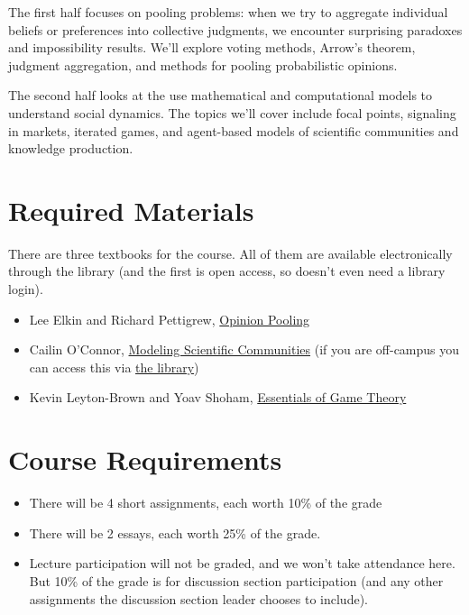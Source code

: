 \documentclass[
  letterpaper,
  DIV=11,
  numbers=noendperiod]{scrartcl}
\providecommand{\tightlist}{%
  \setlength{\itemsep}{0pt}\setlength{\parskip}{0pt}}
\begin{document}
The first half focuses on pooling problems: when we try to aggregate
individual beliefs or preferences into collective judgments, we
encounter surprising paradoxes and impossibility results. We'll explore
voting methods, Arrow's theorem, judgment aggregation, and methods for
pooling probabilistic opinions.

The second half looks at the use mathematical and computational models
to understand social dynamics. The topics we'll cover include focal
points, signaling in markets, iterated games, and agent-based models of
scientific communities and knowledge production.

\section{Required Materials}\label{required-materials}

There are three textbooks for the course. All of them are available
electronically through the library (and the first is open access, so
doesn't even need a library login).

\begin{itemize}
\tightlist
\item
  Lee Elkin and Richard Pettigrew,
  \href{https://www.cambridge.org/core/elements/opinion-pooling/40647AA21F276CF80F67398058682294}{Opinion
  Pooling}
\item
  Cailin O'Connor,
  \href{https://www.cambridge.org/core/elements/abs/modelling-scientific-communities/1ED3515216067E40A37A72094EE3CB15}{Modeling
  Scientific Communities} (if you are off-campus you can access this via
  \href{https://search.lib.umich.edu/catalog/record/99187887203306381}{the
  library})
\item
  Kevin Leyton-Brown and Yoav Shoham,
  \href{https://link-springer-com.proxy.lib.umich.edu/book/10.1007/978-3-031-01545-8}{Essentials
  of Game Theory}
\end{itemize}

\section{Course Requirements}\label{course-requirements}

\begin{itemize}
\tightlist
\item
  There will be 4 short assignments, each worth 10\% of the grade
\item
  There will be 2 essays, each worth 25\% of the grade.
\item
  Lecture participation will not be graded, and we won't take attendance
  here. But 10\% of the grade is for discussion section participation
  (and any other assignments the discussion section leader chooses to
  include).
\end{itemize}
\end{document}
